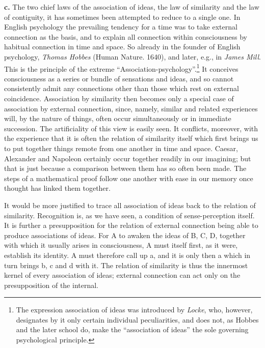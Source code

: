 \documentclass[12pt,a4paper]{book}
\newcommand{\opage}[1]{\marginnote{\footnotesize\textit{[#1]}}}
\begin{document}
\textbf{c.} The two chief laws of the association of ideas, the law of
similarity and the law of contiguity, it has sometimes been attempted to
reduce to a single one. In English psychology the prevailing tendency
for a time was to take external connection as the basis, and to explain
all connection within consciousness by habitual connection in time and
space. So already in the founder of English psychology, \emph{Thomas
Hobbes} (Human Nature. 1640), and later, e.g., in \emph{James Mill}.
This is
\opage{192}the principle of the extreme
``Association-psychology''.\footnote{The expression association of ideas
was introduced by \emph{Locke}, who, however, designates by it only
certain individual peculiarities, and does not, as Hobbes and the later
school do, make the ``association of ideas'' the sole governing
psychological principle.} It conceives consciousness as a series or
bundle of sensations and ideas, and so cannot consistently admit any
connections other than those which rest on external coincidence.
Association by similarity then becomes only a special case of
association by external connection, since, namely, similar and related
experiences will, by the nature of things, often occur simultaneously or
in immediate succession. The artificiality of this view is easily seen.
It conflicts, moreover, with the experience that it is often the
relation of similarity itself which first brings us to put together
things remote from one another in time and space. Caesar, Alexander and
Napoleon certainly occur together readily in our imagining; but that is
just because a comparison between them has so often been made. The
steps of a mathematical proof follow one another with ease in our memory
once thought has linked them together.

It would be more justified to trace all association of ideas back to the
relation of similarity. Recognition is, as we have seen, a condition of
sense-perception itself. It is further a presupposition for the relation
of external connection being able to produce associations of ideas. For
A to awaken the ideas of B, C, D, together with which it usually arises
in consciousness, A must itself first, as it were, establish its
identity. A must therefore call up a, and it is only then a which in
turn brings b, c and d with it. The relation of similarity is thus the
innermost kernel of every association of ideas; external connection can
act only on the presupposition of the internal.
\end{document}
